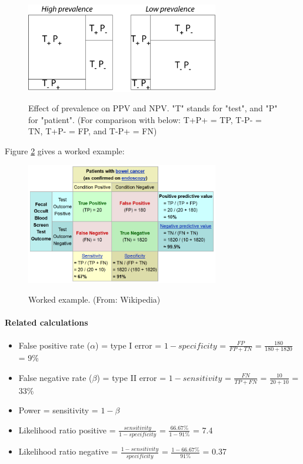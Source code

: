 \begin{figure}[ht]
  \centering
  \includegraphics[width=0.75\textwidth]{../Images/Sensitivity_Specificity.png}\\
  \caption{Effect of prevalence on PPV and NPV. "T" stands for "test", and "P" for "patient". (For comparison with below: T+P+ = TP, T-P- = TN, T+P- = FP, and T-P+ = FN)} \label{fig:prevalence}
\end{figure}

Figure \ref{fig:sens_spec_example} gives a worked example:

\begin{figure}[ht]
  \centering
  \includegraphics[width=0.75\textwidth]{../Images/Sensitivity_Specificity_Example.png}\\
  \caption{Worked example. (From: Wikipedia)}\label{fig:sens_spec_example}
\end{figure}

\paragraph{Related calculations}

\begin{itemize}
  \item False positive rate ($\alpha$) = type I error = $1 - specificity$ = $\frac{FP}{FP + TN}$ = $\frac{180}{180+1820}$ = 9\%
  \item False negative rate ($\beta$) = type II error = $1 - sensitivity$ = $\frac{FN}{TP + FN}$ = $\frac{10}{20+10}$ = 33\%
  \item Power = sensitivity = $1−\beta$
  \item Likelihood ratio positive = $\frac{sensitivity}{1−specificity}$ = $\frac{66.67\%}{1−91\%}$ = 7.4
  \item Likelihood ratio negative = $\frac{1−sensitivity}{specificity}$ = $\frac{1−66.67\%}{91\%}$ = 0.37
\end{itemize}

